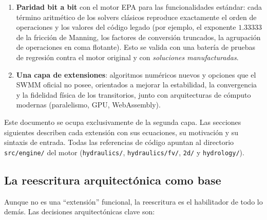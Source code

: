 \documentclass[11pt,a4paper]{article}
\begin{document}
\begin{enumerate}[nosep]
  \item \textbf{Paridad bit a bit} con el motor EPA para las funcionalidades
        estándar: cada término aritmético de los solvers clásicos reproduce
        exactamente el orden de operaciones y los valores del código legado
        (por ejemplo, el exponente $1.33333$ de la fricción de Manning, los
        factores de conversión truncados, la agrupación de operaciones en coma
        flotante). Esto se valida con una batería de pruebas de regresión
        contra el motor original y con \emph{soluciones manufacturadas}.
  \item \textbf{Una capa de extensiones}: algoritmos numéricos nuevos y
        opciones que el SWMM oficial no posee, orientados a mejorar la
        estabilidad, la convergencia y la fidelidad física de los transitorios,
        junto con arquitecturas de cómputo modernas (paralelismo, GPU,
        WebAssembly).
\end{enumerate}

Este documento se ocupa exclusivamente de la segunda capa. Las secciones
siguientes describen cada extensión con sus ecuaciones, su motivación y su
sintaxis de entrada. Todas las referencias de código apuntan al directorio
\texttt{src/engine/} del motor (\texttt{hydraulics/},
\texttt{hydraulics/fv/}, \texttt{2d/} y \texttt{hydrology/}).

\subsection{La reescritura arquitectónica como base}

Aunque no es una ``extensión'' funcional, la reescritura es el habilitador de
todo lo demás. Las decisiones arquitectónicas clave son:
\end{document}
